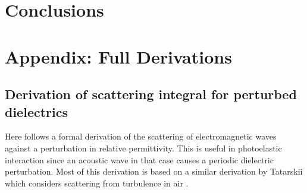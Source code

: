 \documentclass[10pt,a4paper]{eitExjobb}
\begin{document}
	\chapter{Conclusions}
	
	
	
	
	\appendix
	
	\chapter{Appendix: Full Derivations \label{app:derivations}}
	
	\section{Derivation of scattering integral for perturbed dielectrics \label{sec:app-derivations-scatter}}
	Here follows a formal derivation of the scattering of electromagnetic waves against a perturbation in relative permittivity. This is useful in photoelastic interaction since an acoustic wave in that case causes a periodic dielectric perturbation. Most of this derivation is based on a similar derivation by Tatarskii which considers scattering from turbulence in air \cite{Tatarskii1971}.
	
\end{document}
